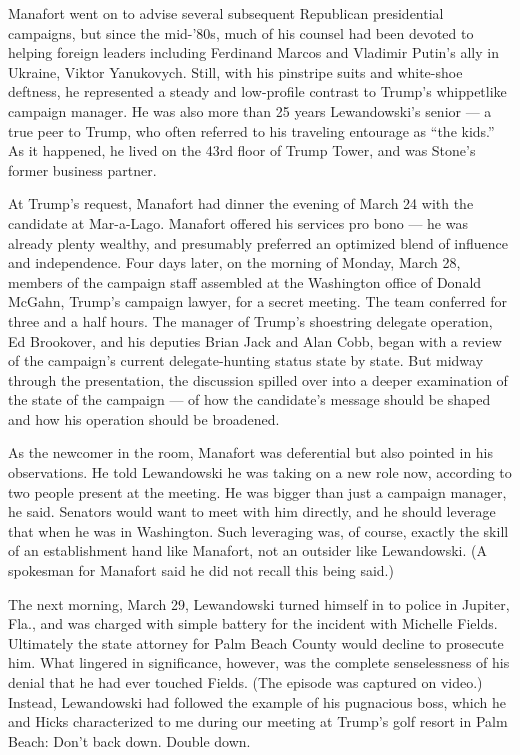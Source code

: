 Manafort went on to advise several subsequent Republican presidential
campaigns, but since the mid-'80s, much of his counsel had been devoted
to helping foreign leaders including Ferdinand Marcos and Vladimir
Putin's ally in Ukraine, Viktor Yanukovych. Still, with his pinstripe
suits and white-shoe deftness, he represented a steady and low-profile
contrast to Trump's whippetlike campaign manager. He was also more than
25 years Lewandowski's senior --- a true peer to Trump, who often
referred to his traveling entourage as ``the kids.'' As it happened, he
lived on the 43rd floor of Trump Tower, and was Stone's former business
partner.

At Trump's request, Manafort had dinner the evening of March 24 with the
candidate at Mar-a-Lago. Manafort offered his services pro bono --- he
was already plenty wealthy, and presumably preferred an optimized blend
of influence and independence. Four days later, on the morning of
Monday, March 28, members of the campaign staff assembled at the
Washington office of Donald McGahn, Trump's campaign lawyer, for a
secret meeting. The team conferred for three and a half hours. The
manager of Trump's shoestring delegate operation, Ed Brookover, and his
deputies Brian Jack and Alan Cobb, began with a review of the campaign's
current delegate-hunting status state by state. But midway through the
presentation, the discussion spilled over into a deeper examination of
the state of the campaign --- of how the candidate's message should be
shaped and how his operation should be broadened.

As the newcomer in the room, Manafort was deferential but also pointed
in his observations. He told Lewandowski he was taking on a new role
now, according to two people present at the meeting. He was bigger than
just a campaign manager, he said. Senators would want to meet with him
directly, and he should leverage that when he was in Washington. Such
leveraging was, of course, exactly the skill of an establishment hand
like Manafort, not an outsider like Lewandowski. (A spokesman for
Manafort said he did not recall this being said.)

The next morning, March 29, Lewandowski turned himself in to police in
Jupiter, Fla., and was charged with simple battery for the incident with
Michelle Fields. Ultimately the state attorney for Palm Beach County
would decline to prosecute him. What lingered in significance, however,
was the complete senselessness of his denial that he had ever touched
Fields. (The episode was captured on video.) Instead, Lewandowski had
followed the example of his pugnacious boss, which he and Hicks
characterized to me during our meeting at Trump's golf resort in Palm
Beach: Don't back down. Double down.

